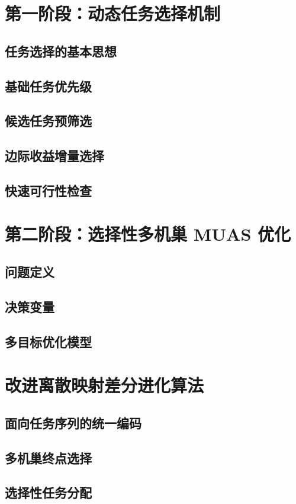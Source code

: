 \section{第一阶段：动态任务选择机制}
\subsection{任务选择的基本思想}
\subsection{基础任务优先级}
\subsection{候选任务预筛选}
\subsection{边际收益增量选择}
\subsection{快速可行性检查}

\section{第二阶段：选择性多机巢 MUAS 优化}
\subsection{问题定义}
\subsection{决策变量}
\subsection{多目标优化模型}

\section{改进离散映射差分进化算法}
\subsection{面向任务序列的统一编码}
\subsection{多机巢终点选择}
\subsection{选择性任务分配}
